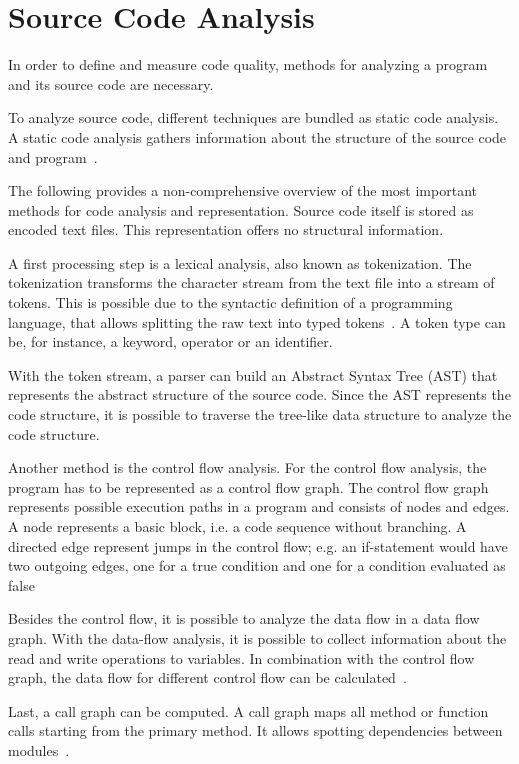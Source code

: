 \section{Source Code Analysis}\label{sec:code_analysis}
In order to define and measure code quality, methods for analyzing a program and its source code are necessary.

To analyze source code, different techniques are bundled as static code analysis. A static code analysis gathers information about the structure of the source code and program~\cite{prahofer_static_2017}.

The following provides a non-comprehensive overview of the most important methods for code analysis and representation.
Source code itself is stored as encoded text files. This representation offers no structural information. 

A first processing step is a lexical analysis, also known as tokenization. The tokenization transforms the character stream from the text file into a stream of tokens. This is possible due to the syntactic definition of a programming language, that allows splitting the raw text into typed tokens~\cite{mogensen_introduction_2017}. A token type can be, for instance, a keyword, operator or an identifier.

With the token stream, a parser can build an Abstract Syntax Tree (AST) that represents the abstract structure of the source code.
Since the AST represents the code structure, it is possible to traverse the tree-like data structure to analyze the code structure.

Another method is the control flow analysis. For the control flow analysis, the program has to be represented as a control flow graph. The control flow graph represents possible execution paths in a program and consists of nodes and edges. A node represents a basic block, i.e. a code sequence without branching. A directed edge represent jumps in the control flow; e.g. an if-statement would have two outgoing edges, one for a true condition and one for a condition evaluated as false~\cite{allen_control_1970}

Besides the control flow, it is possible to analyze the data flow in a data flow graph. With the data-flow analysis, it is possible to collect information about the read and write operations to variables. In combination with the control flow graph, the data flow for different control flow can be calculated~\cite{mogensen_introduction_2017}.

Last, a call graph can be computed. A call graph maps all method or function calls starting from the primary method. It allows spotting dependencies between modules~\cite{prahofer_static_2017}.

